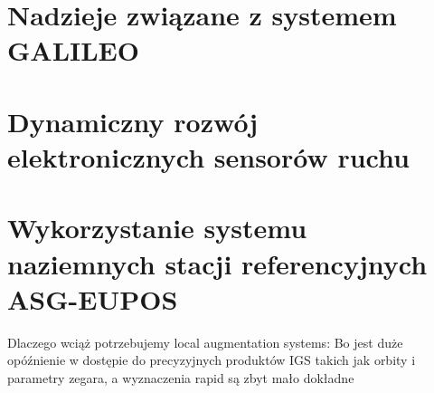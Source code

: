 \section{Nadzieje związane z systemem GALILEO}
\section{Dynamiczny rozwój elektronicznych sensorów ruchu}
\section{Wykorzystanie systemu naziemnych stacji referencyjnych ASG-EUPOS}
Dlaczego wciąż potrzebujemy local augmentation systems:
Bo jest duże opóźnienie w dostępie do precyzyjnych produktów IGS takich jak orbity i parametry zegara,
a wyznaczenia rapid są zbyt mało dokładne \cite[][strona 215]{ggos}
